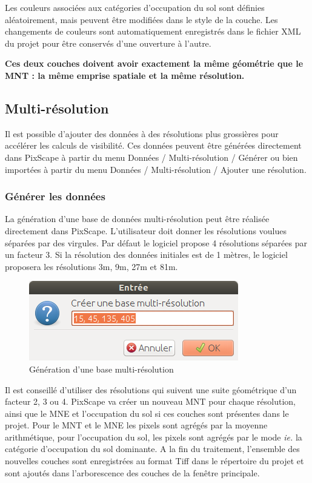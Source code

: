 \documentclass{report}
\begin{document}
Les couleurs associées aux catégories d'occupation du sol sont définies aléatoirement, mais peuvent être modifiées dans le style de la couche. Les changements de couleurs sont automatiquement enregistrés dans le fichier XML du projet pour être conservés d'une ouverture à l'autre.

\textbf{Ces deux couches doivent avoir exactement la même géométrie que le MNT : la même emprise spatiale et la même résolution.} 

\subsection{Multi-résolution}
Il est possible d'ajouter des données à des résolutions plus grossières pour accélérer les calculs de visibilité. Ces données peuvent être générées directement dans PixScape à partir du menu Données / Multi-résolution / Générer ou bien importées à partir du menu Données / Multi-résolution / Ajouter une résolution.

\subsubsection{Générer les données}
La génération d'une base de données multi-résolution peut être réalisée directement dans PixScape. L'utilisateur doit donner les résolutions voulues séparées par des virgules. Par défaut le logiciel propose 4 résolutions séparées par un facteur 3. Si la résolution des données initiales est de 1 mètres, le logiciel proposera les résolutions 3m, 9m, 27m et 81m.

\begin{figure}[H]
	\includegraphics[scale=0.5]{img/gen_ms-fr.png} 
	\caption{Génération d'une base multi-résolution}
\end{figure}

Il est conseillé d'utiliser des résolutions qui suivent une suite géométrique d'un facteur 2, 3 ou 4.
PixScape va créer un nouveau MNT pour chaque résolution, ainsi que le MNE et l'occupation du sol si ces couches sont présentes dans le projet.
Pour le MNT et le MNE les pixels sont agrégés par la moyenne arithmétique, pour l'occupation du sol, les pixels sont agrégés par le mode \textit{ie.} la catégorie d'occupation du sol dominante.
A la fin du traitement, l'ensemble des nouvelles couches sont enregistrées au format Tiff dans le répertoire du projet et sont ajoutés dans l'arborescence des couches de la fenêtre principale.
\end{document}
